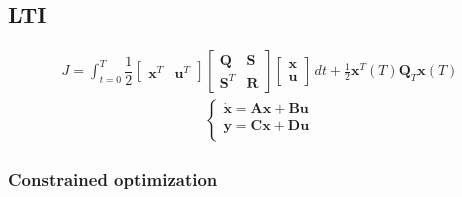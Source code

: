 \documentclass[letterpaper,10pt,english]{jupyterBook}
\begin{document}
\subsection{LTI}
\label{\detokenize{ch/control/optimal-control-full-state-old:lti}}\label{\detokenize{ch/control/optimal-control-full-state-old:control-optimal-full-state-fb-lti}}\begin{equation*}
\begin{split}J = \int_{t=0}^{T} \dfrac{1}{2} \begin{bmatrix} \mathbf{x}^T & \mathbf{u}^T \end{bmatrix} \begin{bmatrix}  \mathbf{Q} & \mathbf{S} \\ \mathbf{S}^T & \mathbf{R} \end{bmatrix} \begin{bmatrix} \mathbf{x} \\ \mathbf{u} \end{bmatrix} \, dt + \frac{1}{2} \mathbf{x}^T(T) \mathbf{Q}_T \mathbf{x}(T) \end{split}
\end{equation*}\begin{equation}\label{equation:ch/control/optimal-control-full-state-old:eq:optimal:lti:eqns}
\begin{split}\begin{cases}
  \dot{\mathbf{x}} = \mathbf{A} \mathbf{x} + \mathbf{B} \mathbf{u} \\
       \mathbf{y}  = \mathbf{C} \mathbf{x} + \mathbf{D} \mathbf{u} \\
\end{cases}\end{split}
\end{equation}\subsubsection*{Constrained optimization}
\end{document}
